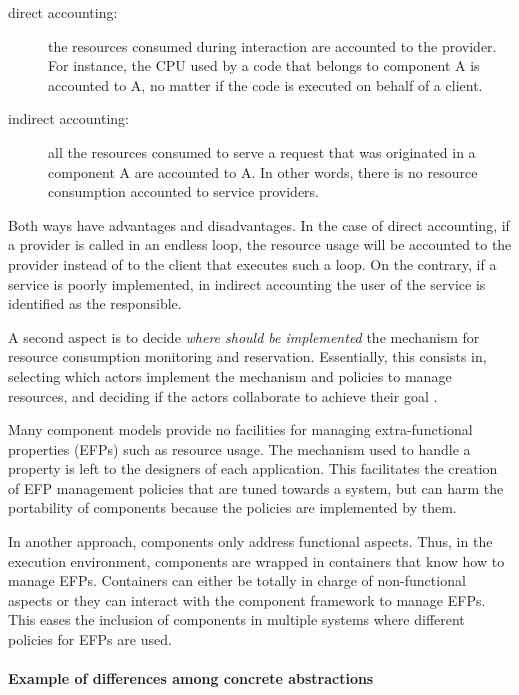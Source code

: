 \begin{description}
\item[direct accounting:] the resources consumed during
interaction are accounted to the provider.
For instance, the CPU used by a code that belongs
to component A is accounted to A, no matter if the code is executed on behalf of a client.

\item[indirect accounting:] all the resources consumed to serve a request that was originated in a component A are accounted to A.
In other words, there is no resource consumption accounted to service providers.
\end{description}

Both ways have advantages and disadvantages.
In the case of direct accounting, if a provider is
called in an endless loop, the resource usage will be accounted
to the provider instead of to the client that executes such a loop.
On the contrary, if a service is poorly implemented, in indirect accounting the user of the service is identified as the responsible.

A second aspect is to decide \textit{where should be implemented} the mechanism for resource consumption monitoring and reservation.
Essentially, this consists in, selecting which actors implement the mechanism and policies to manage resources, and deciding if the actors collaborate to achieve their goal \cite{Crnkovic2011}.

Many component models provide no facilities for managing extra-functional properties (EFPs) such as resource usage.
The mechanism used to handle a property is left to the designers of each application.
This facilitates the creation of EFP management policies that are tuned towards a system, but can harm the portability of components because the policies are implemented by them.

In another approach, components only address functional aspects.
Thus, in the execution environment, components
are wrapped in containers that know how to manage EFPs.
Containers can either be totally in charge of non-functional aspects or
they can interact with the component framework to manage EFPs.
This eases the inclusion of components in multiple systems where different policies for EFPs are used.

\paragraph{Example of differences among concrete abstractions}

